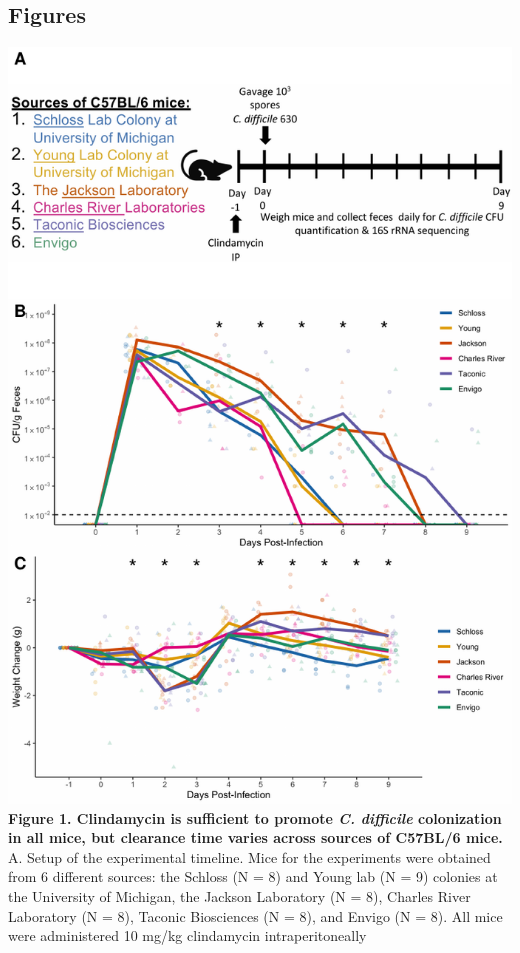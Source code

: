 \documentclass[11pt,]{article}
\begin{document}
\newpage

\subsection{Figures}\label{figures}

\includegraphics{figure_1.pdf} \textbf{Figure 1. Clindamycin is
sufficient to promote \emph{C. difficile} colonization in all mice, but
clearance time varies across sources of C57BL/6 mice.} A. Setup of the
experimental timeline. Mice for the experiments were obtained from 6
different sources: the Schloss (N = 8) and Young lab (N = 9) colonies at
the University of Michigan, the Jackson Laboratory (N = 8), Charles
River Laboratory (N = 8), Taconic Biosciences (N = 8), and Envigo (N =
8). All mice were administered 10 mg/kg clindamycin intraperitoneally
\end{document}
